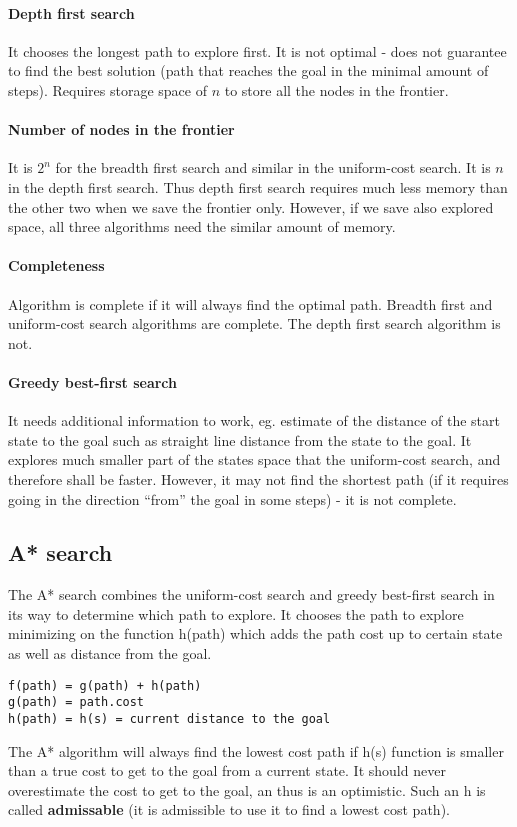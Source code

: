 \documentclass[a4paper,10pt]{article}
\begin{document}
\paragraph{Depth first search}
It chooses the longest path to explore first. It is not optimal - does not guarantee to find the best solution (path that reaches the goal in the minimal amount of steps). Requires storage space of $n$ to store all the nodes in the frontier.

\paragraph{Number of nodes in the frontier}
It is $2^n$ for the breadth first search and similar in the uniform-cost search. It is $n$ in the depth first search. Thus depth first search requires much less memory than the other two when we save the frontier only. However, if we save also explored space, all three algorithms need the similar amount of memory.

\paragraph{Completeness}
Algorithm is complete if it will always find the optimal path. Breadth first and uniform-cost search algorithms are complete. The depth first search algorithm is not.

\paragraph{Greedy best-first search}
It needs additional information to work, eg. estimate of the distance of the start state to the goal such as straight line distance from the state to the goal. It explores much smaller part of the states space that the uniform-cost search, and therefore shall be faster. However, it may not find the shortest path (if it requires going in the direction ``from'' the goal in some steps) - it is not complete.

\subsection{A* search}
The A* search combines the uniform-cost search and greedy best-first search in its way to determine which path to explore. It chooses the path to explore minimizing on the function h(path) which adds the path cost up to certain state as well as distance from the goal.
\begin{verbatim}
f(path) = g(path) + h(path)
g(path) = path.cost
h(path) = h(s) = current distance to the goal
\end{verbatim}

The A* algorithm will always find the lowest cost path if h(s) function is smaller than a true cost to get to the goal from a current state. It should never overestimate the cost to get to the goal, an thus is an  optimistic. Such an h is called \textbf{admissable} (it is admissible to use it to find a lowest cost path). 
\end{document}
